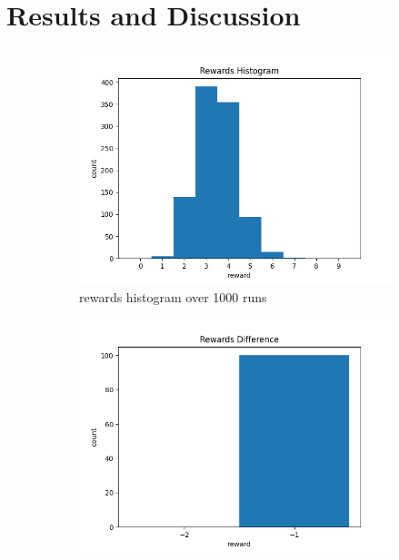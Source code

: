\section{Results and Discussion}
\begin{figure}[htbp]
    \centering
    \begin{subfigure}[htbp]{0.33\textwidth}
        \centering
        \includegraphics[width=\textwidth]{fig/asg1_reward_hist.png}
        \caption{rewards histogram over 1000 runs}
        \label{fig:fig_1}
    \end{subfigure}
    \hfill
    \begin{subfigure}[htbp]{0.33\textwidth}
        \centering
        \includegraphics[width=\textwidth]{fig/asg1_reward_diff.png}

\end{subfigure}
\end{figure}
